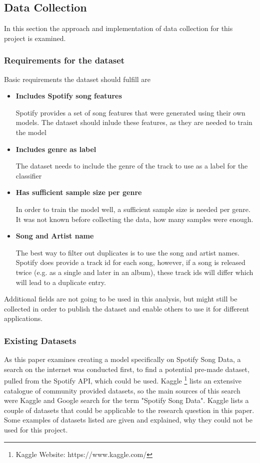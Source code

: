 \subsection{Data Collection}

In this section the approach and implementation of data collection for this project is 
examined.

\subsubsection{Requirements for the dataset}

Basic requirements the dataset should fulfill are

\begin{itemize}
    \item \textbf{Includes Spotify song features}

    Spotify provides a set of song features that were generated using their own models.
    The dataset should inlude these features, as they are needed to train the model
    \item \textbf{Includes genre as label}

    The dataset needs to include the genre of the track to use as a label for the classifier
    \item \textbf{Has sufficient sample size per genre}

    In order to train the model well, a sufficient sample size is needed per genre.
    It was not known before collecting the data, how many samples were enough. 
    \item \textbf{Song and Artist name}

    The best way to filter out duplicates is to use the song and artist names.
    Spotify does provide a track id for each song, however, if a song is released twice
    (e.g. as a single and later in an album), these track ids will differ which will lead to a duplicate entry.
\end{itemize}

Additional fields are not going to be used in this analysis, but might still be collected in order to publish the
dataset and enable others to use it for different applications.

\subsubsection{Existing Datasets}

As this paper examines creating a model specifically on Spotify Song Data,
a search on the internet was conducted first, to find a potential pre-made dataset,
pulled from the Spotify \ac{API}, which could be used.
Kaggle \footnote{Kaggle Website: https://www.kaggle.com/} lists an extensive
catalogue of community provided datasets, so the main sources of this search were
Kaggle and Google search for the term "Spotify Song Data".
Kaggle lists a couple of datasets that could be applicable to the research question in
this paper. Some examples of datasets listed are given and explained, why they could not 
be used for this project.

